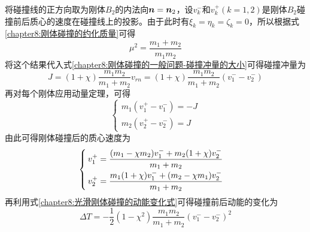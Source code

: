 将碰撞线的正方向取为刚体$B_2$的内法向$\boldsymbol{n}=\boldsymbol{n}_2$，设$v_k^-$和$v_k^+(k=1,2)$是刚体$B_2$碰撞前后质心的速度在碰撞线上的投影。由于此时有$\xi_k=\eta_k=\zeta_k=0$，所以根据式\eqref{chapter8:刚体碰撞的约化质量}可得
\begin{equation}
	\mu^2 = \frac{m_1+m_2}{m_1m_2}
\end{equation}
将这个结果代入式\eqref{chapter8:刚体碰撞的一般问题-碰撞冲量的大小}可得碰撞冲量为
\begin{equation}
	J = (1+\chi)\frac{m_1m_2}{m_1+m_2}v_{rn} = (1+\chi)\frac{m_1m_2}{m_1+m_2}(v_1^--v_2^-)
	\label{chapter8:光滑刚体对心碰撞的撞击冲量}
\end{equation}
再对每个刚体应用动量定理，可得
\begin{equation}
\begin{cases}
	m_1(v_1^+-v_1^-) = -J \\
	m_2(v_2^+-v_2^-) = J
\end{cases}
\end{equation}
由此可得刚体碰撞后的质心速度为
\begin{equation}
\begin{cases}
	\displaystyle v_1^+ = \frac{(m_1-\chi m_2)v_1^-+m_2(1+\chi)v_2^-}{m_1+m_2} \\[1.5ex]
	\displaystyle v_2^+ = \frac{m_1(1+\chi)v_1^-+(m_2-\chi m_1)v_2^-}{m_1+m_2}
\end{cases}
\label{chapter2:光滑刚体对心碰撞后的质心速度}
\end{equation}
再利用式\eqref{chapter8:光滑刚体碰撞的动能变化式}可得碰撞前后动能的变化为
\begin{equation}
	\Delta T = -\frac12 (1-\chi^2)\frac{m_1m_2}{m_1+m_2}(v_1^--v_2^-)^2
	\label{chapter8:光滑刚体对心碰撞的动能变化式}
\end{equation}

